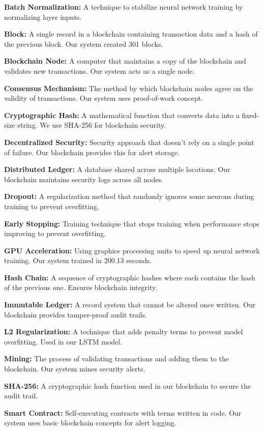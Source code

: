 \documentclass[12pt,a4paper]{report}
\begin{document}
\textbf{Batch Normalization:} A technique to stabilize neural network training by normalizing layer inputs.

\textbf{Block:} A single record in a blockchain containing transaction data and a hash of the previous block. Our system created 301 blocks.

\textbf{Blockchain Node:} A computer that maintains a copy of the blockchain and validates new transactions. Our system acts as a single node.

\textbf{Consensus Mechanism:} The method by which blockchain nodes agree on the validity of transactions. Our system uses proof-of-work concept.

\textbf{Cryptographic Hash:} A mathematical function that converts data into a fixed-size string. We use SHA-256 for blockchain security.

\textbf{Decentralized Security:} Security approach that doesn't rely on a single point of failure. Our blockchain provides this for alert storage.

\textbf{Distributed Ledger:} A database shared across multiple locations. Our blockchain maintains security logs across all nodes.

\textbf{Dropout:} A regularization method that randomly ignores some neurons during training to prevent overfitting.

\textbf{Early Stopping:} Training technique that stops training when performance stops improving to prevent overfitting.

\textbf{GPU Acceleration:} Using graphics processing units to speed up neural network training. Our system trained in 200.13 seconds.

\textbf{Hash Chain:} A sequence of cryptographic hashes where each contains the hash of the previous one. Ensures blockchain integrity.

\textbf{Immutable Ledger:} A record system that cannot be altered once written. Our blockchain provides tamper-proof audit trails.

\textbf{L2 Regularization:} A technique that adds penalty terms to prevent model overfitting. Used in our LSTM model.

\textbf{Mining:} The process of validating transactions and adding them to the blockchain. Our system mines security alerts.

\textbf{SHA-256:} A cryptographic hash function used in our blockchain to secure the audit trail.

\textbf{Smart Contract:} Self-executing contracts with terms written in code. Our system uses basic blockchain concepts for alert logging.
\end{document}
